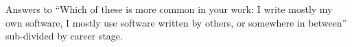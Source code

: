 \label{fig:write1}

Answers to ``Which of these is more common in your work: I write mostly my own software, I mostly use software written by others, or somewhere in between'' sub-divided by career stage.